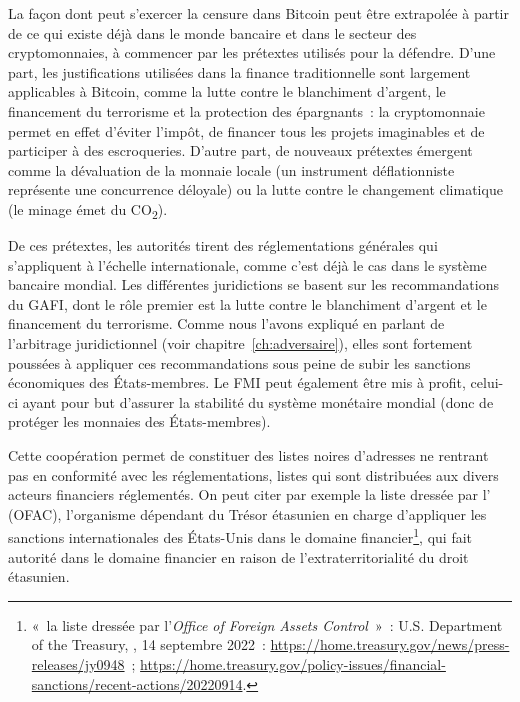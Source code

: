 La façon dont peut s'exercer la censure dans Bitcoin peut être extrapolée à partir de ce qui existe déjà dans le monde bancaire et dans le secteur des cryptomonnaies, à commencer par les prétextes utilisés pour la défendre. D'une part, les justifications utilisées dans la finance traditionnelle sont largement applicables à Bitcoin, comme la lutte contre le blanchiment d'argent, le financement du terrorisme et la protection des épargnants~: la cryptomonnaie permet en effet d'éviter l'impôt, de financer tous les projets imaginables et de participer à des escroqueries. D'autre part, de nouveaux prétextes émergent comme la dévaluation de la monnaie locale (un instrument déflationniste représente une concurrence déloyale) ou la lutte contre le changement climatique (le minage émet du CO\textsubscript{2}).

De ces prétextes, les autorités tirent des réglementations générales qui s'appliquent à l'échelle internationale, comme c'est déjà le cas dans le système bancaire mondial. Les différentes juridictions se basent sur les recommandations du GAFI, dont le rôle premier est la lutte contre le blanchiment d'argent et le financement du terrorisme. Comme nous l'avons expliqué en parlant de l'arbitrage juridictionnel (voir chapitre~\ref{ch:adversaire}), elles sont fortement poussées à appliquer ces recommandations sous peine de subir les sanctions économiques des États-membres. Le FMI peut également être mis à profit, celui-ci ayant pour but d'assurer la stabilité du système monétaire mondial (donc de protéger les monnaies des États-membres). %

Cette coopération permet de constituer des listes noires d'adresses ne rentrant pas en conformité avec les réglementations, listes qui sont distribuées aux divers acteurs financiers réglementés. On peut citer par exemple la liste dressée par l' (OFAC), l'organisme dépendant du Trésor étasunien en charge d'appliquer les sanctions internationales des États-Unis dans le domaine financier\footnote{«~la liste dressée par l'\emph{Office of Foreign Assets Control}~»~: U.S. Department of the Treasury, , 14 septembre 2022~: \url{https://home.treasury.gov/news/press-releases/jy0948}~; \url{https://home.treasury.gov/policy-issues/financial-sanctions/recent-actions/20220914}.}, qui fait autorité dans le domaine financier en raison de l'extraterritorialité du droit étasunien.

